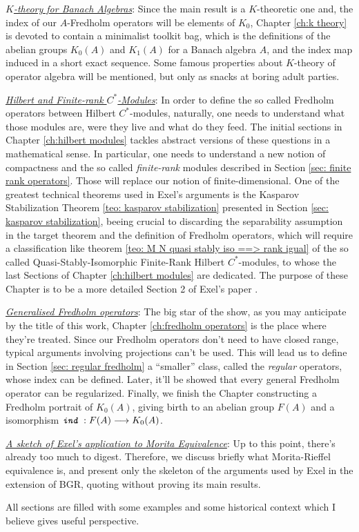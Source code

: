 \begin{itroman}
	\item \underline{\textit{$K$-theory for Banach Algebras}}: Since the main result is a $K$-theoretic one and, the index of our $A$-Fredholm operators will be elements of $K_0$, Chapter \ref{ch:k theory} is devoted to contain a minimalist toolkit bag, which is the definitions of the abelian groups $K_0(A)$ and $K_1(A)$ for a Banach algebra $A$, and the index map induced in a short exact sequence. Some famous properties about $K$-theory of operator algebra will be mentioned, but only as snacks at boring adult parties.
	\item \underline{\textit{Hilbert and Finite-rank \ensuremath{C^*}-Modules}}: In order to define the so called Fredholm operators between Hilbert $C^*$-modules, naturally, one needs to understand what those modules are, were they live and what do they feed. The initial sections in Chapter \ref{ch:hilbert modules} tackles abstract versions of these questions in a mathematical sense. In particular, one needs to understand a new notion of compactness and the so called \textit{finite-rank} modules described in Section \ref{sec: finite rank operators}. Those will replace our notion of finite-dimensional. One of the greatest technical theorems used in Exel's arguments is the Kasparov Stabilization Theorem \ref{teo: kasparov stabilization} presented in Section \ref{sec: kasparov stabilization}, beeing crucial to discarding the separability assumption in the target theorem and the definition of Fredholm operators, which will require a classification like theorem \ref{teo: M N quasi stably iso ==> rank igual} of the so called Quasi-Stably-Isomorphic Finite-Rank Hilbert $C^*$-modules, to whose the last Sections of Chapter \ref{ch:hilbert modules} are dedicated. The purpose of these Chapter is to be a more detailed Section 2 of Exel's paper \cite{exel7fredholm}.
	
	\item \underline{\textit{Generalised Fredholm operators}}: The big star of the show, as you may anticipate by the title of this work, Chapter \ref{ch:fredholm operators} is the place where they're treated. Since our Fredholm operators don't need to have closed range, typical arguments involving projections can't be used. This will lead us to define in Section \ref{sec: regular fredholm} a ``smaller'' class, called the \textit{regular} operators, whose index can be defined. Later, it'll be showed that every general Fredholm operator can be regularized. Finally, we finish the Chapter constructing a Fredholm portrait of $K_0(A)$, giving birth to an abelian group $F(A)$ and a isomorphism $\texttt{\textit{ind}}\, : F(A) \longrightarrow K_0(A)$.
	
	\item \underline{\textit{A sketch of Exel's application to Morita Equivalence}}: Up to this point, there's already too much to digest. Therefore, we discuss briefly what Morita-Rieffel equivalence is, and present only the skeleton of the arguments used by Exel in the extension of BGR, quoting without proving its main results.      
\end{itroman}

All sections are filled with some examples and some historical context which I believe gives useful perspective. 

